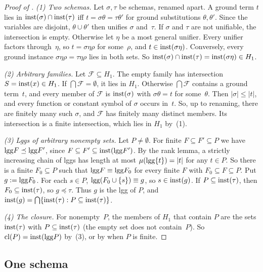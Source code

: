 \begin{proof}[Proof of ]
\emph{(1) Two schemas.} Let $\sigma,\tau$ be schemas, renamed apart. A ground term $t$ lies in $\mathrm{inst}(\sigma)\cap\mathrm{inst}(\tau)$ iff $t=\sigma\theta=\tau\theta'$ for ground substitutions $\theta,\theta'$. Since the variables are disjoint, $\theta\cup\theta'$ then unifies $\sigma$ and~$\tau$. If $\sigma$ and $\tau$ are not unifiable, the intersection is empty. Otherwise let $\eta$ be a most general unifier. Every unifier factors through~$\eta$, so $t=\sigma\eta\rho$ for some~$\rho$, and $t\in\mathrm{inst}(\sigma\eta)$. Conversely, every ground instance $\sigma\eta\rho=\tau\eta\rho$ lies in both sets. So $\mathrm{inst}(\sigma)\cap\mathrm{inst}(\tau)=\mathrm{inst}(\sigma\eta)\in H_1$.

\emph{(2) Arbitrary families.} Let $\mathcal F\subseteq H_1$. The empty family has intersection $S=\mathrm{inst}(x)\in H_1$. If $\bigcap\mathcal F=\emptyset$, it lies in $H_1$. Otherwise $\bigcap\mathcal F$ contains a ground term~$t$, and every member of $\mathcal F$ is $\mathrm{inst}(\sigma)$ with $\sigma\theta=t$ for some~$\theta$. Then $|\sigma|\le|t|$, and every function or constant symbol of $\sigma$ occurs in~$t$. So, up to renaming, there are finitely many such $\sigma$, and $\mathcal F$ has finitely many distinct members. Its intersection is a finite intersection, which lies in $H_1$ by~(1).

\emph{(3) Lggs of arbitrary nonempty sets.} Let $P\neq\emptyset$. For finite $F\subseteq F'\subseteq P$ we have $\mathrm{lgg} F\preceq\mathrm{lgg} F'$, since $F\subseteq F'\subseteq\mathrm{inst}(\mathrm{lgg} F')$. By the rank lemma, a strictly increasing chain of lggs has length at most $\mu(\mathrm{lgg}\{t\})=|t|$ for any $t\in P$. So there is a finite $F_0\subseteq P$ such that $\mathrm{lgg} F\equiv\mathrm{lgg} F_0$ for every finite $F$ with $F_0\subseteq F\subseteq P$. Put $g:=\mathrm{lgg} F_0$. For each $s\in P$, $\mathrm{lgg}(F_0\cup\{s\})\equiv g$, so $s\in\mathrm{inst}(g)$. If $P\subseteq\mathrm{inst}(\tau)$, then $F_0\subseteq\mathrm{inst}(\tau)$, so $g\preceq\tau$. Thus $g$ is the lgg of $P$, and $\mathrm{inst}(g)=\bigcap\{\mathrm{inst}(\tau):P\subseteq\mathrm{inst}(\tau)\}$.

\emph{(4) The closure.} For nonempty~$P$, the members of $H_1$ that contain $P$ are the sets $\mathrm{inst}(\tau)$ with $P\subseteq\mathrm{inst}(\tau)$ (the empty set does not contain~$P$). So $\mathrm{cl}(P)=\mathrm{inst}(\mathrm{lgg} P)$ by~(3), or by  when $P$ is finite.
\end{proof}

\subsection{One schema}\label{app:caution:single}

